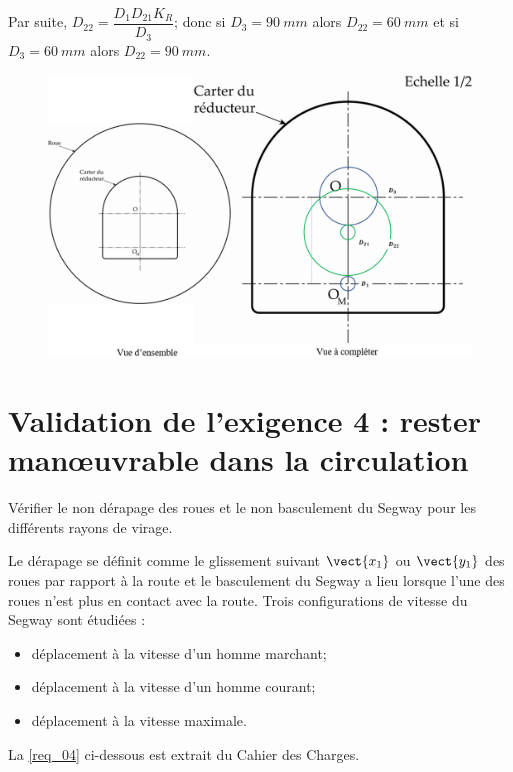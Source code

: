 \documentclass[10pt,fleqn]{article} %
\begin{document}
\begin{corrige}
Par suite,  $D_{22}=\dfrac{D_1 D_{21} K_R}{D_3 }$; donc 
 si $D_3 = \SI{90}{mm}$ alors $D_{22}=\SI{60}{mm} $
et  si $D_3 = \SI{60}{mm}$ alors $D_{22}= \SI{90}{mm}$.


\begin{figure}[H]
\centering
\includegraphics[width=0.9\linewidth]{cor_07}
\end{figure}


\end{corrige}
\else
\fi



\section{Validation de l'exigence 4 : rester man\oe{}uvrable dans la circulation}
\begin{obj}
Vérifier le non dérapage des roues et le non basculement du Segway pour les différents rayons de virage.
\end{obj}
\ifprof
\else

Le dérapage se définit comme le glissement suivant $\vect{x_1}$ ou $\vect{y_1}$ des roues par rapport à la route et le basculement du Segway a lieu lorsque l’une des roues n’est plus en contact avec la route. Trois configurations de vitesse du Segway sont étudiées :
\begin{itemize}
\item déplacement à la vitesse d’un homme marchant;
\item déplacement à la vitesse d’un homme courant;
\item déplacement à la vitesse maximale.
\end{itemize}

La \autoref{req_04} ci-dessous est extrait du Cahier des Charges.
\end{document}
